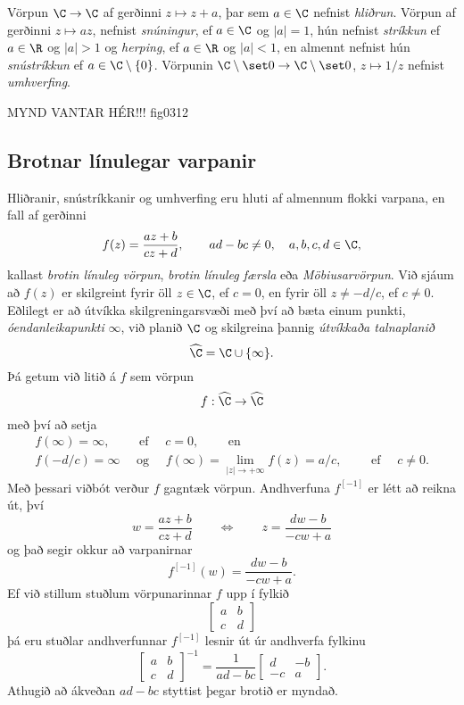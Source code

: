 Vörpun $\C\to \C$ af gerðinni $z\mapsto z+a$, þar sem 
$a\in \C$ nefnist {\it hliðrun}.
Vörpun af gerðinni $z\mapsto az$, nefnist
{\it snúningur}, ef $a\in
\C$ og  $|a|=1$, hún nefnist {\it
stríkkun} ef $a\in
\R$ og $|a|>1$ og {\it herping}, ef  
$a\in \R$ og $|a|<1$, en almennt nefnist hún
{\it snústríkkun} ef $a\in \C\setminus\{0\}$.
Vörpunin $\C\setminus\set 0 \to \C\setminus\set 0$, 
$z\mapsto 1/z$ nefnist {\it
umhverfing}.

\bigskip
MYND VANTAR HÉR!!! {fig0312}{}


\subsection*{Brotnar línulegar varpanir}

Hliðranir, snústríkkanir og umhverfing eru hluti af almennum flokki
varpana, en fall af gerðinni 
 $$f(z)=\dfrac{az+b}{cz+d}, \qquad ad-bc\neq 0, \quad a,b,c,d\in \C,
 $$
kallast {\it brotin línuleg vörpun},
{\it brotin línuleg færsla}
eða {\it Möbiusarvörpun}.  Við
sjáum að $f(z)$  er skilgreint fyrir öll $z\in \C$,  ef $c=0$, en fyrir
öll $z\neq -d/c$, ef $c\neq 0$.  
Eðlilegt er að útvíkka
skilgreningarsvæði með því að bæta einum punkti, {\it
óendanleikapunkti}   $\infty$, 
við planið $\C$ og skilgreina þannig {\it útvíkkaða talnaplanið}
$$
\widehat \C=\C\cup \{\infty\}.
$$
Þá getum við litið á $f$ sem vörpun
 $$f:\widehat \C \to \widehat \C
 $$
með því að setja
\begin{gather*}
f(\infty)=\infty, \qquad \text{ ef } \quad c=0, \qquad \text{ en }\\
f(-d/c)=\infty \quad \text{ og } \quad f(\infty)=\lim_{|z|\to+\infty}f(z)=a/c, \qquad
\text{ ef } \quad c\neq 0.
\end{gather*}
Með þessari viðbót verður $f$ gagntæk vörpun.  
Andhverfuna $f^{[-1]}$ er létt að
reikna út, því
 $$w=\dfrac{az+b}{cz+d} \qquad \Leftrightarrow \qquad
z=\dfrac{dw-b}{-cw+a}
 $$
og það  segir okkur að varpanirnar 
$$
f^{[-1]}(w)=\dfrac{dw-b}{-cw+a}.
$$
Ef við stillum stuðlum vörpunarinnar $f$ upp í fylkið
$$
\left[\begin{matrix} a&b\\c&d\end{matrix}\right]
$$
þá eru stuðlar andhverfunnar $f^{[-1]}$ lesnir út úr andhverfa fylkinu 
 $$\left[\begin{matrix} a&b\\c&d\end{matrix}\right]^{-1}=
\dfrac 1{ad-bc}\left[\begin{matrix} d&-b\\-c&a\end{matrix}\right].
 $$
Athugið að ákveðan $ad-bc$ styttist þegar brotið er myndað.

